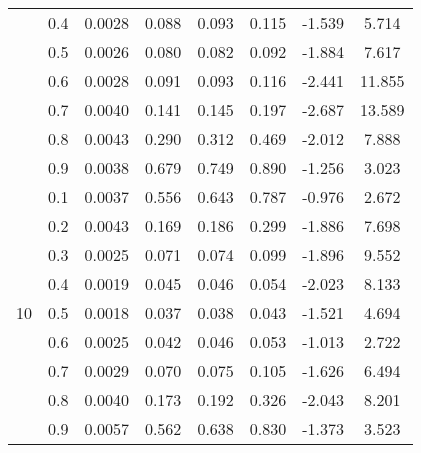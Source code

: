 \documentclass[11pt,a4paper]{report}
\begin{document}
\begin{longtable}{ | c | c || c | c | c | c | c | c | }
 & 0.4 & 0.0028 & 0.088 & 0.093 & 0.115 & -1.539 & 5.714 \\
 & 0.5 & 0.0026 & 0.080 & 0.082 & 0.092 & -1.884 & 7.617 \\
 & 0.6 & 0.0028 & 0.091 & 0.093 & 0.116 & -2.441 & 11.855 \\
 & 0.7 & 0.0040 & 0.141 & 0.145 & 0.197 & -2.687 & 13.589 \\
 & 0.8 & 0.0043 & 0.290 & 0.312 & 0.469 & -2.012 & 7.888 \\
 & 0.9 & 0.0038 & 0.679 & 0.749 & 0.890 & -1.256 & 3.023 \\
 \hline
\multirow{9}{*}{10} & 0.1 & 0.0037 & 0.556 & 0.643 & 0.787 & -0.976 & 2.672 \\
 & 0.2 & 0.0043 & 0.169 & 0.186 & 0.299 & -1.886 & 7.698 \\
 & 0.3 & 0.0025 & 0.071 & 0.074 & 0.099 & -1.896 & 9.552 \\
 & 0.4 & 0.0019 & 0.045 & 0.046 & 0.054 & -2.023 & 8.133 \\
 & 0.5 & 0.0018 & 0.037 & 0.038 & 0.043 & -1.521 & 4.694 \\
 & 0.6 & 0.0025 & 0.042 & 0.046 & 0.053 & -1.013 & 2.722 \\
 & 0.7 & 0.0029 & 0.070 & 0.075 & 0.105 & -1.626 & 6.494 \\
 & 0.8 & 0.0040 & 0.173 & 0.192 & 0.326 & -2.043 & 8.201 \\
 & 0.9 & 0.0057 & 0.562 & 0.638 & 0.830 & -1.373 & 3.523 \\
 \hline
\hline
\end{longtable}
\end{document}
